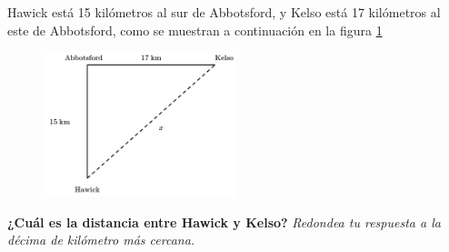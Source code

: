 Hawick está 15 kilómetros al sur de Abbotsford,
y Kelso está 17 kilómetros al este de Abbotsford,
como se muestran a continuación en la figura \ref{fig:proverb_pitagoras_08}
\begin{figure}[H]
    \begin{center}
        \includegraphics[width=0.5\textwidth]{../images/proverb_pitagoras_08.png}
    \end{center}
    \caption{}
    \label{fig:proverb_pitagoras_08}
\end{figure}
\textbf{¿Cuál es la distancia entre Hawick y Kelso?}
\textit{Redondea tu respuesta a la décima de kilómetro más cercana.}